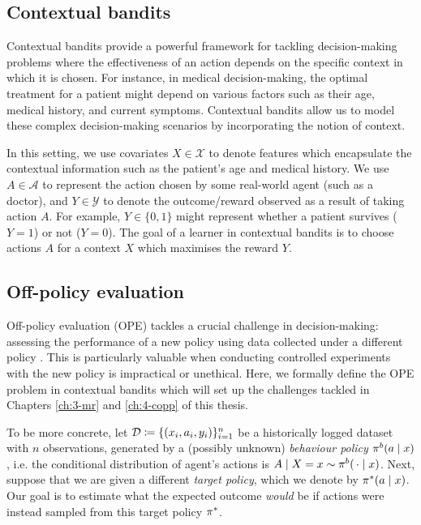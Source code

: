 \subsection{Contextual bandits}
Contextual bandits \citep{Lattimore_Szepesvári_2020} provide a powerful framework for tackling decision-making problems where the effectiveness of an action depends on the specific context in which it is chosen. 
For instance, in medical decision-making, the optimal treatment for a patient might depend on various factors such as their age, medical history, and current symptoms. 
Contextual bandits allow us to model these complex decision-making scenarios by incorporating the notion of context.

In this setting, we use covariates $X \in \mathcal{X}$ to denote features which encapsulate the contextual information such as the patient's age and medical history. We use $A \in \mathcal{A}$ to represent the action chosen by some real-world agent (such as a doctor), and $Y \in \mathcal{Y}$ to denote the outcome/reward observed as a result of taking action $A$. For example, $Y \in \{0, 1\}$ might represent whether a patient survives ($Y=1$) or not ($Y=0$). The goal of a learner in contextual bandits is to choose actions $A$ for a context $X$ which maximises the reward $Y$. 

\subsection{Off-policy evaluation}
Off-policy evaluation (OPE) tackles a crucial challenge in decision-making: assessing the performance of a new policy using data collected under a different policy \citep{swaminathan2015counterfactual, wang2017optimal, farajtabar2018more, su2019continuous, metelli2021subgaussian, liu2019triply, sugiyama2012machine, swaminathan2017off}. This is particularly valuable when conducting controlled experiments with the new policy is impractical or unethical. Here, we formally define the OPE problem in contextual bandits which will set up the challenges tackled in Chapters \ref{ch:3-mr} and \ref{ch:4-copp} of this thesis. 

To be more concrete, let $\mathcal{D}\coloneqq \{(x_i, a_i, y_i)\}_{i=1}^n$ be a historically logged dataset with $n$ observations, generated by a (possibly unknown) \emph{behaviour policy} $\pi^b(a\mid x)$, i.e. the conditional distribution of agent's actions is $A\mid X=x \sim \pi^b(\,\cdot\mid x)$.
Next, suppose that we are given a different \emph{target policy}, which we denote by $\pi^*(a\mid x)$. Our goal is to estimate what the expected outcome \emph{would} be if actions were instead sampled from this target policy $\pi^*$.

